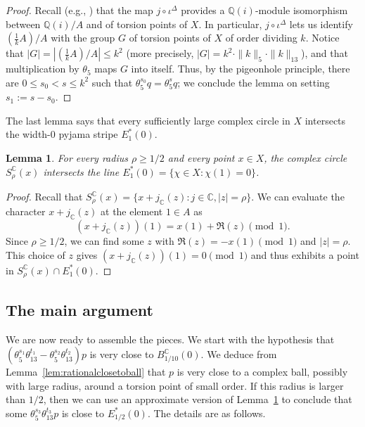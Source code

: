\documentclass[11pt]{amsart}
\newcommand{\NK}[1]{\textcolor{olive}{\textsf{#1}}}
\newtheorem{lemma}{Lemma}[section]
\theoremstyle{definition}
\newcommand{\C}{{\mathbb C}}
\newcommand{\Q}{{\mathbb Q}}
\newcommand{\Z}{{\mathbb Z}}
\begin{document}
\begin{proof}
Recall (e.g., \cite[Proposition 6.2]{Man13}) that the map $j \circ \iota^{\Delta}$ provides a $\Q(i)$-module isomorphism between $\Q(i)/A$ and of torsion points of $X$.  In particular, $j \circ \iota^{\Delta}$ lets us identify $(\frac{1}{k}A)/A$ with the group $G$ of torsion points of $X$ of order dividing $k$.  Notice that $|G|=|(\frac{1}{k}A)/A|\leq k^2$ (more precisely, $|G|=k^2 \cdot \|k\|_5 \cdot \|k\|_{13}$), and that multiplication by $\theta_5$ maps $G$ into itself.  Thus, by the pigeonhole principle, there are  $0 \leq s_0<s \leq k^2$ such that $\theta_5^{s_0}q=\theta_5^{s}q$; we conclude the lemma on setting $s_1:=s-s_0$. %
\end{proof}

The last lemma says that every sufficiently large complex circle in $X$ intersects the width-$0$ pyjama stripe $E_1^*(0)$.

\begin{lemma}\label{lem:sphereintersection}
For every radius $\rho\geq 1/2$ and every point $x \in X$, the complex circle $S_\rho^{\mathbb{C}}(x)$ intersects the line $E^*_1(0)=\{\chi \in X: \chi(1)=0\}$.
\end{lemma}
\begin{proof}
Recall that $S_\rho^{\C}(x)=\{x+j_{\C}(z): j \in \C, |z|=\rho\}$. We can evaluate the character $x+j_{\C}(z)$ at the element $1 \in A$ as
$$(x+j_{\C}(z))(1)=x(1)+\Re(z) \pmod{1}.$$
Since $\rho \geq 1/2$, we can find some $z$ with $\Re(z)=-x(1) \pmod{1}$ and $|z|=\rho$.  This choice of $z$ gives $(x+j_{\C}(z))(1)=0 \pmod{1}$ and thus exhibits a point in $S_\rho^{\C}(x) \cap E_1^*(0)$.
\end{proof}




\subsection{The main argument}
We are now ready to assemble the pieces.  We start with the hypothesis that $(\theta_5^{s_1} \theta_{13}^{t_1}-\theta_5^{s_2}\theta_{13}^{t_2})p$ is very close to $B_{1/10}^{\C}(0)$.  We deduce from Lemma~\ref{lem:rationalclosetoball} that $p$ is very close to a complex ball, possibly with large radius, around a torsion point of small order.  If this radius is larger than $1/2$, then we can use an approximate version of Lemma~\ref{lem:sphereintersection} to conclude that some $\theta_5^{s_3}\theta_{13}^{t_3}p$ is close to $E_{1/2}^*(0)$. The details are as follows.
\end{document}
